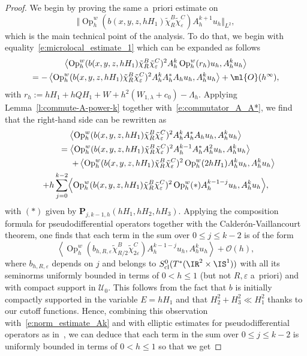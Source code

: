\documentclass[10pt]{amsart}
\theoremstyle{plain}
\theoremstyle{definition}
\theoremstyle{remark}
\newcommand{\Op}{\operatorname{Op}}
\begin{document}
\begin{proof}
We begin by proving the same a~priori estimate on
\[
\Vert \Op_h^w(b(x,y,z,hH_1)\tilde{\chi}_R^B\tilde{\chi}_\varepsilon^C)A^{k+1}_h u_h \Vert_{L^2},
\]
which is the main technical point of the analysis. To do that, we begin with equality~\eqref{e:microlocal_estimate_1} which can be expanded as follows
\begin{multline*}
\left\langle \Op_h^w(b(x,y,z,hH_1)\tilde{\chi}_R^B\tilde{\chi}_\varepsilon^C)^2A_h^k\Op_h^w(r_h)u_h,A_h^ku_h\right\rangle \\ =-\left\langle \Op_h^w(b(x,y,z,hH_1)\tilde{\chi}_R^B\tilde{\chi}_\varepsilon^C)^2A_h^kA_h^*A_h u_h,A_h^ku_h\right\rangle
+ \ml{O}(h^\infty),
\end{multline*}
with $r_h:=hH_1+hQH_1+W+h^2(W_{1,\lambda}+c_0)-\Lambda_h$. Applying Lemma~\ref{l:commute-A-power-k} together with~\eqref{e:commutator_A_A*}, we find that the right-hand side can be rewritten as
\begin{multline*}
\left\langle \Op_h^w(b(x,y,z,hH_1)\tilde{\chi}_R^B\tilde{\chi}_\varepsilon^C)^2A_h^kA_h^*A_h u_h,A_h^ku_h\right\rangle \\
=\left\langle \Op_h^w(b(x,y,z,hH_1)\tilde{\chi}_R^B\tilde{\chi}_\varepsilon^C)^2A_h^{k-1}A_h^*A_h^2 u_h,A_h^ku_h\right\rangle\\ \hspace*{1.5cm}+\left\langle \Op_h^w(b(x,y,z,hH_1)\tilde{\chi}_R^B\tilde{\chi}_\varepsilon^C)^2\Op_h^w(2hH_1)A_h ^ku_h,A_h^ku_h\right\rangle\\ +h\sum_{j=0}^{k-2}\Bigl\langle \Op_h^w(b(x,y,z,hH_1)\tilde{\chi}_R^B\tilde{\chi}_\varepsilon^C)^2\Op_{h}^w(*)A_h^{k-1-j} u_h,A_h^ku_h\Bigr\rangle,
\end{multline*}
with $(*)$ given by $\boldsymbol{P}_{j,k-1,h}(hH_1,hH_2,hH_3).$ Applying the composition formula for pseudodifferential operators together with the Cal\-de\-rón-Vaillancourt theorem, one finds that each term in the sum over $0\leq j\leq k-2$ is of the form
\[
\left\langle \Op_h^w(b_{h,R,\varepsilon}\tilde{\chi}_{R/2}^B\tilde{\chi}_{2\varepsilon}^C)A_h^{k-1-j} u_h,A_h^ku_h\right\rangle+\mathcal{O}(h),
\]
where $b_{h,R,\varepsilon}$ depends on $j$ and belongs to $S^0_{\textup{cl}}(T^*(\IR^2\times \IS^1))$ with all its seminorms uniformly bounded in terms of $0<h\leq 1$ (but not $R,\varepsilon$ a~priori) and with compact support in $\mathcal{U}_0$. This follows from the fact that $b$ is initially compactly supported in the variable $E=hH_1$ and that $H_2^2+H_3^2\ll H_1^2$ thanks to our cutoff functions. Hence, combining this observation with~\eqref{e:norm_estimate_Ak} and with elliptic estimates for pseudodifferential operators as in~\cite[Th.\,E.33]{DyatlovZworski19}, we can deduce that each term in the sum over $0\leq j\leq k-2$ is uniformly bounded in terms of $0<h\leq 1$ so that we get

\end{proof}
\end{document}
